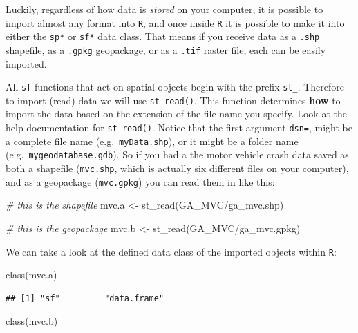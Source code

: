 \documentclass[
]{book}
\newenvironment{Shaded}{\begin{snugshade}}{\end{snugshade}}
\newcommand{\CommentTok}[1]{\textcolor[rgb]{0.56,0.35,0.01}{\textit{#1}}}
\newcommand{\FunctionTok}[1]{\textcolor[rgb]{0.00,0.00,0.00}{#1}}
\newcommand{\NormalTok}[1]{#1}
\newcommand{\OtherTok}[1]{\textcolor[rgb]{0.56,0.35,0.01}{#1}}
\newcommand{\StringTok}[1]{\textcolor[rgb]{0.31,0.60,0.02}{#1}}
\begin{document}
Luckily, regardless of how data is \emph{stored} on your computer, it is possible to import almost any format into \texttt{R}, and once inside \texttt{R} it is possible to make it into either the \texttt{sp*} or \texttt{sf*} data class. That means if you receive data as a \texttt{.shp} shapefile, as a \texttt{.gpkg} geopackage, or as a \texttt{.tif} raster file, each can be easily imported.

All \texttt{sf} functions that act on spatial objects begin with the prefix \texttt{st\_}. Therefore to import (read) data we will use \texttt{st\_read()}. This function determines \textbf{how} to import the data based on the extension of the file name you specify. Look at the help documentation for \texttt{st\_read()}. Notice that the first argument \texttt{dsn=}, might be a complete file name (e.g.~\texttt{myData.shp}), or it might be a folder name (e.g.~\texttt{mygeodatabase.gdb}). So if you had a the motor vehicle crash data saved as both a shapefile (\texttt{mvc.shp}, which is actually six different files on your computer), and as a geopackage (\texttt{mvc.gpkg}) you can read them in like this:

\begin{Shaded}
\begin{Highlighting}[]
\CommentTok{\# this is the shapefile}
\NormalTok{mvc.a }\OtherTok{\textless{}{-}} \FunctionTok{st\_read}\NormalTok{(}\StringTok{\textquotesingle{}GA\_MVC/ga\_mvc.shp\textquotesingle{}}\NormalTok{)}

\CommentTok{\# this is the geopackage}
\NormalTok{mvc.b }\OtherTok{\textless{}{-}} \FunctionTok{st\_read}\NormalTok{(}\StringTok{\textquotesingle{}GA\_MVC/ga\_mvc.gpkg\textquotesingle{}}\NormalTok{)}
\end{Highlighting}
\end{Shaded}

We can take a look at the defined data class of the imported objects within \texttt{R}:

\begin{Shaded}
\begin{Highlighting}[]
\FunctionTok{class}\NormalTok{(mvc.a)}
\end{Highlighting}
\end{Shaded}

\begin{verbatim}
## [1] "sf"         "data.frame"
\end{verbatim}

\begin{Shaded}
\begin{Highlighting}[]
\FunctionTok{class}\NormalTok{(mvc.b)}
\end{Highlighting}
\end{Shaded}
\end{document}
